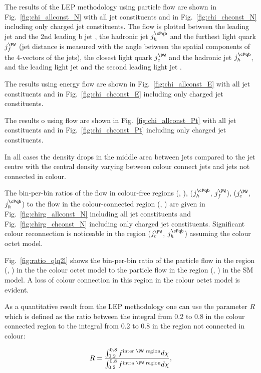 The results of the LEP methodology using particle flow are shown in Fig.~\ref{fig:chi_allconst_N} with all jet constituents and in Fig.~\ref{fig:chi_chconst_N} including only charged jet constituents. The flow is plotted between the leading \cPqb jet \leadingb and the 2nd leading b jet \scndleadingb, the hadronic \cPqb jet $j_{h}^{\cPqb}$ and the furthest light quark $j_{f}^{\PW}$ (jet distance is measured with the angle between the spatial components of the 4-vectors of the jets), the closest light quark $j_{c}^{\PW}$ and the hadronic \cPqb jet $j_{h}^{\cPqb}$, and the leading light jet \leadingjet and the second leading light jet \scndleadingjet.

The results using energy flow are shown in Fig.~\ref{fig:chi_allconst_E} with all jet constituents and in Fig.~\ref{fig:chi_chconst_E} including only charged jet constituents.

The results o using \pt flow are shown in Fig.~\ref{fig:chi_allconst_Pt} with all jet constituents and in Fig.~\ref{fig:chi_chconst_Pt} including only charged jet constituents.

In all cases the density drops in the middle area between jets compared to the jet centre with the central density varying between colour connect jets and jets not connected in colour.

The bin-per-bin ratios of the flow in colour-free regions (\leadingb, \scndleadingb), ($j_{h}^{\cPqb}$, $j_{f}^{\PW}$), ($j_{c}^{\PW}$, $j_{h}^{\cPqb}$) to the flow in the colour-connected region (\leadingjet, \scndleadingjet) are given in Fig.~\ref{fig:chirg_allconst_N} including all jet constituents and Fig.~\ref{fig:chirg_chconst_N} including only charged jet constituents. Significant colour reconnection is noticeable in the region ($j_{c}^{\PW}$, $j_{h}^{\cPqb}$) assuming the colour octet \PW model.

Fig.~\ref{fig:ratio_qlq2l} shows the bin-per-bin ratio of the particle flow in the region (\leadingjet, \scndleadingjet) in the the colour octet \PW model to the particle flow in the region (\leadingjet, \scndleadingjet) in the SM model. A loss of colour connection in this region in the colour octet \PW model is evident.

As a quantitative result from the LEP methodology one can use the parameter $R$ which is defined as the ratio between the integral from 0.2 to 0.8 in the colour connected region to the integral from 0.2 to 0.8 in the region not connected in colour:

\begin{equation}
R=\frac{\int_{0.2}^{0.8}f^{\text{inter \PW region}}d\chi}{\int_{0.2}^{0.8}f^{\text{intra \PW region}}d\chi},
\end{equation}

